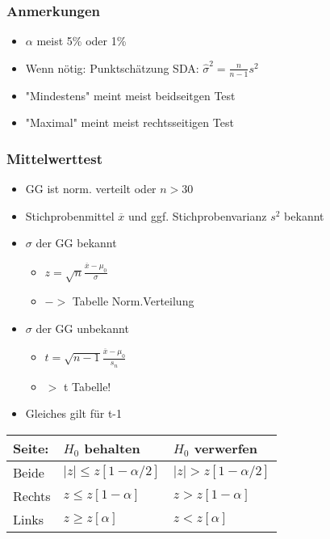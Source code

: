 \documentclass[a4paper]{article}
\begin{document}
\begin{landscape}
\begin{multicols}{4}
        \subsubsection*{Anmerkungen}
        \begin{itemize}[noitemsep,nolistsep,leftmargin=*]
            \item $\alpha$ meist 5\% oder 1\%
            \item Wenn nötig: Punktschätzung SDA: $\hat{\sigma}^2 = \frac{n}{n-1}s^2$
            \item "Mindestens" meint meist beidseitgen Test
            \item "Maximal" meint meist rechtsseitigen Test
        \end{itemize}
        \subsubsection*{Mittelwerttest}
        \begin{itemize}[noitemsep,nolistsep,leftmargin=*]
            \item GG ist norm. verteilt oder $n > 30$
            \item Stichprobenmittel $\overline{x}$ und ggf. Stichprobenvarianz $s^2$ bekannt
            \item $\sigma$ der GG bekannt
            \begin{itemize}[noitemsep,nolistsep,leftmargin=*]
                \item $z = \sqrt{n}\frac{\overline{x}-\mu_0}{\sigma}$
                \item $->$ Tabelle Norm.Verteilung
            \end{itemize}
            \item $\sigma$ der GG unbekannt
            \begin{itemize}[noitemsep,nolistsep,leftmargin=*]
                \item $t = \sqrt{n-1}\frac{\overline{x}-\mu_0}{s_n}$
                \item $>$ t Tabelle!
            \end{itemize}
            \item Gleiches gilt für t-1
        \end{itemize}
        \begin{center}
            \begin{tabular}{|l|l|l|}
             Seite:& $H_0$ behalten & $H_0$ verwerfen  \\ \hline
             Beide & $|z|  \leq z[1-\alpha/2]$  & $|z| > z[1-\alpha/2]$  \\ \hline
             Rechts& $z  \leq z[1-\alpha]$ &  $z > z[1-\alpha]$ \\ \hline
             Links & $z  \geq z[\alpha]$  &  $z < z[\alpha]$ \\ \hline
            \end{tabular}
        \end{center}





\end{multicols}
\end{landscape}
\end{document}
